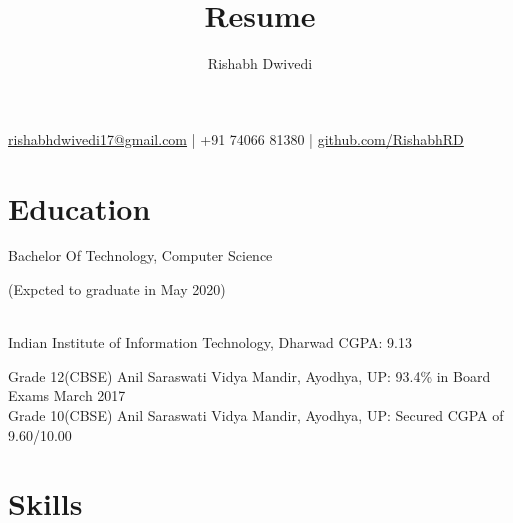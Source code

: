 \documentclass{article}
\author{Rishabh Dwivedi}
\title{Resume}
\begin{document}
\newcommand{\prj}[3]{
	\begin{minipage}{0.6\textwidth} \underline{\textbf{#1}} \end{minipage}
	\begin{minipage}{0.4\textwidth}\begin{flushright} {\small(#3)} \end{flushright}\end{minipage}\linebreak
	{\small(\url{https://github.com/#2})}\\
}

\renewcommand{\maketitle}{
	\begin{center}
		{\huge\bfseries\theauthor}

		\vspace{0.25mm}
		\href{mailto:rishabhdwivedi17@gmail.com}{rishabhdwivedi17@gmail.com} | +91 74066 81380 | \url{github.com/RishabhRD}
	\end{center}
	}
\maketitle

\section{Education}
\footnotesize{
	\begin{minipage}{0.6\textwidth}
		Bachelor Of Technology, Computer Science 
	\end{minipage}
	\begin{minipage}{0.3\textwidth}
		\begin{flushright}
(Expcted to graduate in May 2020)
\end{flushright}
	\end{minipage}
\\Indian Institute of Information Technology, Dharwad	
CGPA: 9.13

Grade 12(CBSE)
Anil Saraswati Vidya Mandir, Ayodhya, UP: 93.4\% in Board Exams March 2017\\
Grade 10(CBSE)
Anil Saraswati Vidya Mandir, Ayodhya, UP: Secured CGPA of 9.60/10.00\\
}
\section{Skills}
\end{document}
